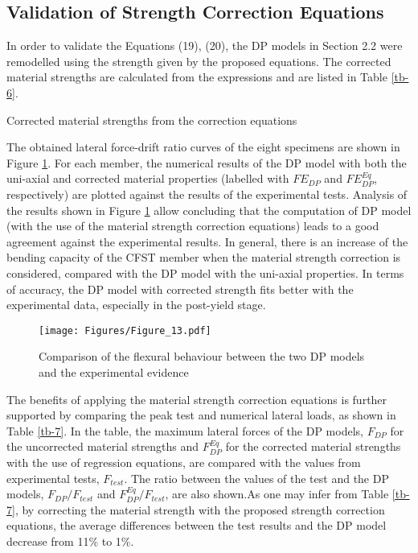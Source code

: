 \documentclass[12pt,a4]{article}
\begin{document}
	\subsection{Validation of Strength Correction Equations}
	In order to validate the Equations (19), (20), the DP models in Section 2.2 were remodelled using the strength given by the proposed equations. The corrected material strengths are calculated from the expressions and are listed in Table \ref{tb-6}.
	\par
	\begin{table}
		\caption{Corrected material strengths from the correction equations}
		\label{tb-6}
	\end{table}
	\par
	The obtained lateral force-drift ratio curves of the eight specimens are shown in Figure \ref{fig-12}. For each member, the numerical results of the DP model with both the uni-axial and corrected material properties (labelled with $FE_{DP}$ and $FE_{DP}^{Eq}$, respectively) are plotted against the results of the experimental tests. Analysis of the results shown in Figure \ref{fig-12} allow concluding that the computation of DP model (with the use of the material strength correction equations) leads to a good agreement against the experimental results. In general, there is an increase of the bending capacity of the CFST member when the material strength correction is considered, compared with the DP model with the uni-axial properties. In terms of accuracy, the DP model with corrected strength fits better with the experimental data, especially in the post-yield stage.
	\par
	\begin{figure}[h]
		\centering
		\texttt{[image: Figures/Figure\_13.pdf]}
		\caption{Comparison of the flexural behaviour between the two DP models and the experimental evidence}
		\label{fig-12}
	\end{figure}
	\par
	The benefits of applying the material strength correction equations is further supported by comparing the peak test and numerical lateral loads, as shown in Table \ref{tb-7}. In the table, the maximum lateral forces of the DP models, $F_{DP}$ for the uncorrected material strengths and $F_{DP}^{Eq}$ for the corrected material strengths with the use of regression equations, are compared with the values from experimental tests, $F_{test}$. The ratio between the values of the test and the DP models, $F_{DP}/F_{test}$ and $F_{DP}^{Eq}/F_{test}$, are also shown.As one may infer from Table \ref{tb-7}, by correcting the material strength with the proposed strength correction equations, the average differences between the test results and the DP model decrease from 11\% to 1\%.
\end{document}
